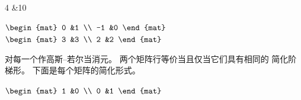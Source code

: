 \begin{exercises}
\begin{exparts*}
\begin{mat}
             4 &10
           \end{mat}\)
      \partsitem
         \(\begin{mat}
             0  &1 \\
             -1 &0
           \end{mat}\)
      \partsitem
         \(\begin{mat}
             3 &3 \\
             2 &2
           \end{mat}\)
    \end{exparts*}
    \begin{answer}
      对每一个作高斯–若尔当消元。
      两个矩阵行等价当且仅当它们具有相同的
      简化阶梯形。
      下面是每个矩阵的简化形式。 
      \begin{exparts*}
        \partsitem
          \(\begin{mat}
              1  &0  \\
              0  &1
            \end{mat} \)

\end{exparts*}
\end{answer}
\end{exercises}
